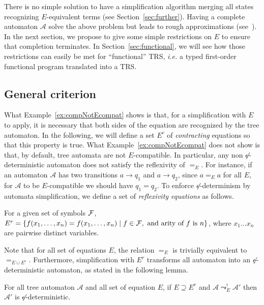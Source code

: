 \documentclass[a4paper,11pt]{llncs}
\newcommand{\A}{\mathcal{A}}
\renewcommand{\varepsilon}{\epsilon}
\newcommand{\epsifree}{\smash{\not}\varepsilon}
\newcommand{\F}{{\cal F}}
\def\ETF{E^{r}}
\def\Ec{E^c}
\newcommand{\rw}{\rightarrow}
\newcommand{\simp}{\leadsto}
\newcommand{\sep}{\; | \;}
\theoremstyle{plain}
\begin{document}
\noindent
There is no simple solution to have a simplification algorithm
merging all states recognizing $E$-equivalent terms (see
Section~\ref{sec:further}). 
Having a complete automaton $\A$ solve the above problem but leads to rough
approximations (see~\cite{Genet-rep13}).
In the next section, we propose to give some simple restrictions on $E$ to
ensure that completion terminates. In Section~\ref{sec:functional}, we will see 
how those restrictions can easily be met for ``functional'' TRS, {\em i.e.} a
typed first-order functional program translated into a TRS. 

\subsection{General criterion}
What Example~\ref{ex:compNotEcompat} shows is that, for a simplification with
$E$ to apply, it is necessary that both sides of the equation are recognized by
the tree automaton. In the following, we will define a set $\Ec$ of {\em
  contracting} equations so that this property is true. What
Example~\ref{ex:compNotEcompat} does not show is that, by default, tree automata
are not $E$-compatible. In particular, any non $\epsifree$-deterministic automaton does not
satisfy the reflexivity of $=_E$. For instance, if an automaton $\A$ has two
transitions $a \rw q_1$ and $a \rw q_2$, since $a=_E a$ for all $E$, for $\A$ to
be $E$-compatible we should have $q_1 = q_2$.  To enforce
$\epsifree$-determinism by automata simplification, we define a set of {\em reflexivity equations} as follows.

\begin{definition}[Set of reflexivity equations $\ETF$]
For a given set of symbols $\F$, $\ETF=\{f(x_1, \ldots, x_n)=f(x_1, \ldots, x_n) \sep
f \in \F, \mbox{ and arity of $f$ is $n$}\}$, where $x_1\ldots x_n$ are pairwise
distinct variables.
\end{definition}

\noindent
Note that for all set of equations $E$, the relation $=_E$ is trivially equivalent to
$=_{E\cup \ETF}$. Furthermore, simplification with $\ETF$ transforms 
all automaton into an $\epsifree$-deterministic automaton, as stated in the
following lemma.

\begin{lemma}
\label{lem:etf_det}
For all tree automaton $\A$ and all set of equation $E$, if $E\supseteq \ETF$
and $\A \simp_E^! \A'$ then $\A'$ is $\epsifree$-deterministic. 
\end{lemma}
\end{document}
